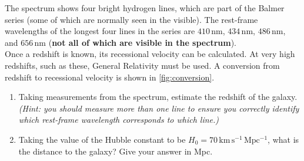 \documentclass[openany,oneside,12pt,hidelinks]{book}
\begin{document}

The spectrum shows four bright hydrogen lines, which are part of the Balmer
series (some of which are normally seen in the visible). The rest-frame
wavelengths of the longest four lines in the series are
\(410\,\mathrm{nm}\), \(434\,\mathrm{nm}\), \(486\,\mathrm{nm}\), and
\(656\,\mathrm{nm}\) (\textbf{not all of which are visible in the spectrum}).
\\
Once a redshift is known, its recessional velocity can be calculated. At very
high redshifts, such as these, General Relativity must be used. A conversion
from redshift to recessional velocity is shown in \ref{fig:conversion}.
\newline \\
\begin{enumerate}[label=\alph*)]
  \item Taking measurements from the spectrum, estimate the redshift of the
        galaxy. \emph{(Hint: you should measure more than one line to ensure you
          correctly identify which rest-frame wavelength corresponds to which line.)}

  \item Taking the value of the Hubble constant to be
        \(H_{0} = 70\,\mathrm{km\,s^{-1}\,Mpc^{-1}}\), what is the distance to the
        galaxy? Give your answer in Mpc.
\end{enumerate}
\end{document}
